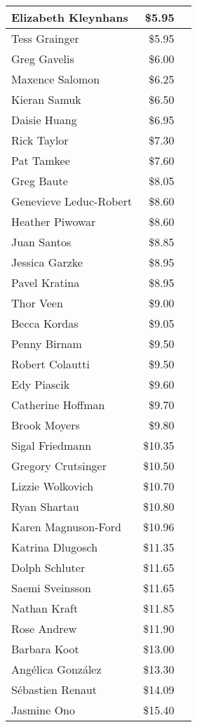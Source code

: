\begin{longtable}{|l|r|c|}
Elizabeth Kleynhans & \$5.95 & \\\hline
Tess Grainger & \$5.95 & \\\hline
Greg Gavelis & \$6.00 & \\\hline
Maxence Salomon & \$6.25 & \\\hline
Kieran Samuk & \$6.50 & \\\hline
Daisie Huang & \$6.95 & \\\hline
Rick Taylor & \$7.30 & \\\hline
Pat Tamkee & \$7.60 & \\\hline
Greg Baute & \$8.05 & \\\hline
Genevieve Leduc-Robert & \$8.60 & \\\hline
Heather Piwowar & \$8.60 & \\\hline
Juan Santos & \$8.85 & \\\hline
Jessica Garzke & \$8.95 & \\\hline
Pavel Kratina & \$8.95 & \\\hline
Thor Veen & \$9.00 & \\\hline
Becca Kordas & \$9.05 & \\\hline
Penny Birnam & \$9.50 & \\\hline
Robert Colautti & \$9.50 & \\\hline
Edy Piascik & \$9.60 & \\\hline
Catherine Hoffman & \$9.70 & \\\hline
Brook Moyers & \$9.80 & \\\hline
Sigal Friedmann & \$10.35 & \\\hline
Gregory Crutsinger & \$10.50 & \\\hline
Lizzie Wolkovich & \$10.70 & \\\hline
Ryan Shartau & \$10.80 & \\\hline
Karen Magnuson-Ford & \$10.96 & \\\hline
Katrina Dlugosch & \$11.35 & \\\hline
Dolph Schluter & \$11.65 & \\\hline
Saemi Sveinsson & \$11.65 & \\\hline
Nathan Kraft & \$11.85 & \\\hline
Rose Andrew & \$11.90 & \\\hline
Barbara Koot & \$13.00 & \\\hline
Ang\'elica Gonz\'alez & \$13.30 & \\\hline
S\'ebastien Renaut & \$14.09 & \\\hline
Jasmine Ono & \$15.40 & \\\hline

\end{longtable}
